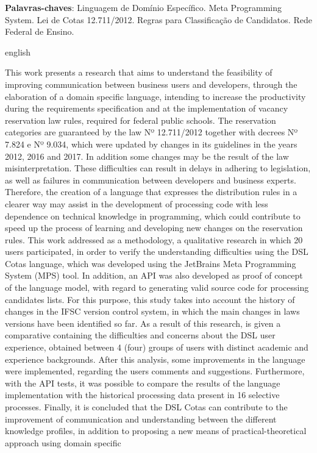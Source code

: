 \begin{resumo}[Resumo]

 \vspace{\onelineskip}
    
 \noindent
 \textbf{Palavras-chaves}: Linguagem de Domínio Específico. Meta Programming System. Lei de Cotas 12.711/2012. Regras para Classificação de Candidatos. Rede Federal de Ensino.
\end{resumo}



\begin{resumo}[Abstract]
\begin{otherlanguage*}{english}

 \noindent
This work presents a research that aims to understand the feasibility of improving communication between business users and developers, through the elaboration of a domain specific language, intending to increase the productivity during the requirements specification and at the implementation of vacancy reservation law rules, required for federal public schools. The reservation categories are guaranteed by the law Nº 12.711/2012 together with decrees Nº 7.824 e Nº 9.034, which were updated by changes in its guidelines in the years 2012, 2016 and 2017. In addition some changes may be the result of the law misinterpretation. These difficulties can result in delays in adhering to legislation, as well as failures in communication between developers and business experts. Therefore, the creation of a language that expresses the distribution rules in a clearer way may assist in the development of processing code with less dependence on technical knowledge in programming, which could contribute to speed up the process of learning and developing new changes on the reservation rules. This work addressed as a methodology, a qualitative research in which 20 users participated, in order to verify the understanding difficulties using the DSL Cotas language, which was developed using the JetBrains Meta Programming System (MPS) tool. In addition, an API was also developed as proof of concept of the language model, with regard to generating valid source code for processing candidates lists. For this purpose, this study takes into account the history of changes in the \gls{IFSC} version control system, in which the main changes in laws versions have been identified so far. As a result of this research, is given a comparative containing the difficulties and concerns about the DSL user experience, obtained between 4 (four) groups of users with distinct academic and experience backgrounds. After this analysis, some improvements in the language were implemented, regarding the users comments and suggestions. Furthermore, with the \gls{API} tests, it was possible to compare the results of the language implementation with the historical processing data present in 16 selective processes. Finally, it is concluded that the DSL Cotas can contribute to the improvement of communication and understanding between the different knowledge profiles, in addition to proposing a new means of practical-theoretical approach using domain specific 
\end{otherlanguage*}
\end{resumo}

